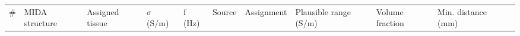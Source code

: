 \documentclass[
  11pt,
  a4paper,
]{article}
\newcounter{none} %
\begin{document}
{\def\LTcaptype{none} %
\begin{landscape}
\let\footnotesize\scriptsize
\begin{longtable}[]{@{}
  >{\raggedright\arraybackslash}p{}
  >{\raggedright\arraybackslash}p{}
  >{\raggedright\arraybackslash}p{}
  >{\raggedright\arraybackslash}p{}
  >{\raggedright\arraybackslash}p{}
  >{\raggedright\arraybackslash}p{}
  >{\raggedright\arraybackslash}p{}
  >{\raggedright\arraybackslash}p{}
  >{\raggedright\arraybackslash}p{}
  >{\raggedright\arraybackslash}p{}
  >{\raggedright\arraybackslash}p{}@{}}
\toprule\noalign{}
\begin{minipage}[b]{\linewidth}\raggedright
\#
\end{minipage} & \begin{minipage}[b]{\linewidth}\raggedright
MIDA structure
\end{minipage} & \begin{minipage}[b]{\linewidth}\raggedright
Assigned tissue
\end{minipage} & \begin{minipage}[b]{\linewidth}\raggedright
$\sigma$ (S/m)
\end{minipage} & \begin{minipage}[b]{\linewidth}\raggedright
f (Hz)
\end{minipage} & \begin{minipage}[b]{\linewidth}\raggedright
Source
\end{minipage} & \begin{minipage}[b]{\linewidth}\raggedright
Assignment
\end{minipage} & \begin{minipage}[b]{\linewidth}\raggedright
Plausible range (S/m)
\end{minipage} & \begin{minipage}[b]{\linewidth}\raggedright
Volume fraction
\end{minipage} & \begin{minipage}[b]{\linewidth}\raggedright
Min. distance (mm)
\end{minipage} & \begin{minipage}[b]{\linewidth}\raggedright

\end{minipage}
\end{longtable}
\end{landscape}}
\end{document}
